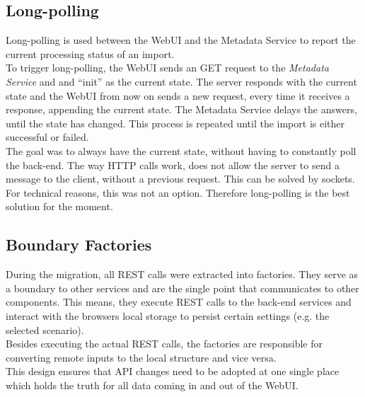 \subsection{Long-polling}
\label{sec:long-polling}
Long-polling is used between the WebUI and the Metadata Service to report the current processing status of an import.\\
To trigger long-polling, the WebUI sends an GET request to the \textit{Metadata Service} and and \enquote{init} as the current state. The server responds with the current state and the WebUI from now on sends a new request, every time it receives a response, appending the current state. The Metadata Service delays the answers, until the state has changed. This process is repeated until the import is either successful or failed.\\
The goal was to always have the current state, without having to constantly poll the back-end. The way HTTP calls work, does not allow the server to send a message to the client, without a previous request. This can be solved by sockets. For technical reasons, this was not an option. Therefore long-polling is the best solution for the moment.

\subsection{Boundary Factories}
During the migration, all REST calls were extracted into factories. They serve as a boundary to other services and are the single point that communicates to other components. This means, they execute REST calls to the back-end services and interact with the browsers local storage to persist certain settings (e.g. the selected scenario).\\
Besides executing the actual REST calls, the factories are responsible for converting remote inputs to the local structure and vice versa.\\
This design ensures that API changes need to be adopted at one single place which holds the truth for all data coming in and out of the WebUI.


